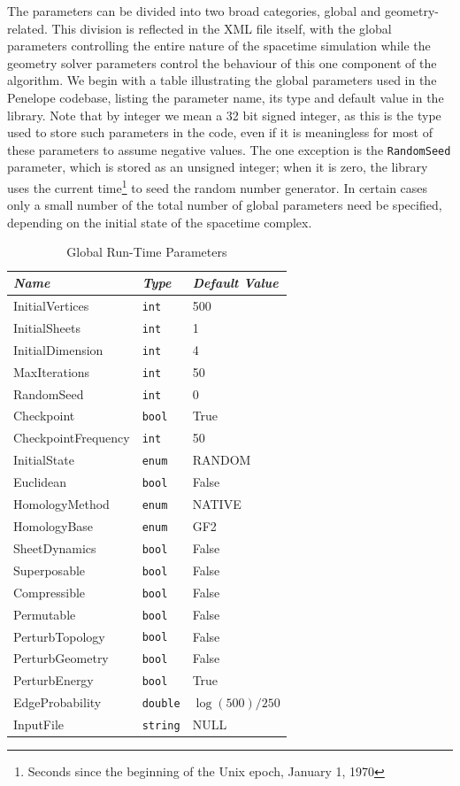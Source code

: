 \documentclass[12pt,letterpaper]{report}
\begin{document}
The parameters can be divided into two broad categories, global and geometry-related. This division 
is reflected in the XML file itself, with the global parameters controlling the entire nature of 
the spacetime simulation while the geometry solver parameters control the behaviour of this one 
component of the algorithm. We begin with a table illustrating the global parameters used in the 
Penelope codebase, listing the parameter name, its type and default value in the library. Note that 
by integer we mean a 32 bit signed integer, as this is the type used to store such parameters in 
the code, even if it is meaningless for most of these parameters to assume negative values. The 
one exception is the \texttt{RandomSeed} parameter, which is stored as an unsigned integer; when it 
is zero, the library uses the current time\footnote{Seconds since the beginning of the Unix epoch, 
January 1, 1970} to seed the random number generator. In certain cases only a small number of the 
total number of global parameters need be specified, depending on the initial state of the 
spacetime complex.
\begin{table}[htbp]
\centering
\begin{tabular}{|l|l|l|}
\hline
\emph{Name} & \emph{Type} & \emph{Default Value} \\ 
\hline \hline
InitialVertices & \texttt{int} & 500 \\ 
InitialSheets & \texttt{int} & 1 \\
InitialDimension & \texttt{int} & 4 \\ 
MaxIterations & \texttt{int} & 50 \\
RandomSeed & \texttt{int} & 0 \\
Checkpoint & \texttt{bool} & True \\ 
CheckpointFrequency & \texttt{int} & 50 \\
InitialState & \texttt{enum} & RANDOM \\ 
Euclidean & \texttt{bool} & False \\
HomologyMethod & \texttt{enum} & NATIVE \\
HomologyBase & \texttt{enum} & GF2 \\
SheetDynamics & \texttt{bool} & False \\
Superposable & \texttt{bool} & False \\
Compressible & \texttt{bool} & False \\ 
Permutable & \texttt{bool} & False \\
PerturbTopology & \texttt{bool} & False \\
PerturbGeometry & \texttt{bool} & False \\
PerturbEnergy & \texttt{bool} & True \\
EdgeProbability & \texttt{double} & $\log(500)/250$ \\
InputFile & \texttt{string} & NULL \\ 
\hline
\end{tabular}
\caption{Global Run-Time Parameters}
\label{rt_parms1}
\end{table}
\end{document}

